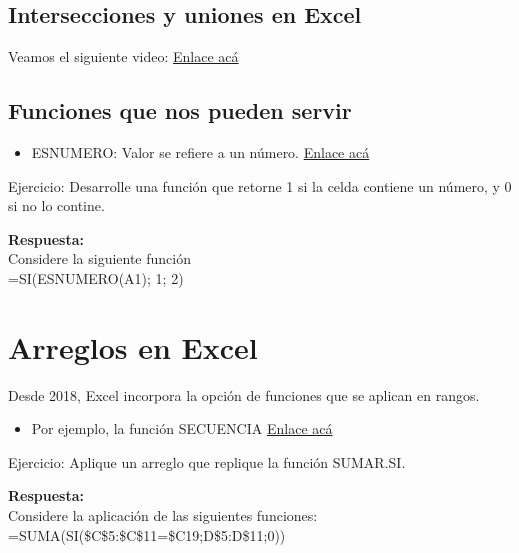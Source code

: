 \documentclass[12 pt,letterpaper]{article}
\newenvironment{solution}
{\begin{mdframed} \textbf{Respuesta:} \ \\}
	{\end{mdframed}}
\begin{document}
\subsection{Intersecciones y uniones en Excel}

Veamos el siguiente video: \href{https://web.microsoftstream.com/video/a00c02ae-3403-40f1-92ee-a5f5e49843f2}{Enlace acá}


\subsection{Funciones que nos pueden servir}

\begin{itemize}
	\item ESNUMERO: Valor se refiere a un número. \href{https://support.microsoft.com/es-es/office/funciones-es-0f2d7971-6019-40a0-a171-f2d869135665}{Enlace acá}

\end{itemize}

\noindent
{\Huge \faBell} Ejercicio: Desarrolle una función que retorne 1 si la celda contiene un número, y 0 si no lo contine. 

\begin{solution}
	
Considere la siguiente función \\

=SI(ESNUMERO(A1); 1; 2)
	
\end{solution}

\section{Arreglos en Excel}

Desde 2018, Excel incorpora la opción de funciones que se aplican en rangos.

\begin{itemize}
	\item 	Por ejemplo, la función SECUENCIA \href{https://support.microsoft.com/es-es/office/función-secuencia-57467a98-57e0-4817-9f14-2eb78519ca90}{Enlace acá} 
\end{itemize}

\noindent
{\Huge \faBell} Ejercicio: Aplique un arreglo que replique la función SUMAR.SI.

\begin{solution}
Considere la aplicación de las siguientes funciones:\\

=SUMA(SI(\$C\$5:\$C\$11=\$C19;D\$5:D\$11;0))
\end{solution}
\end{document}
